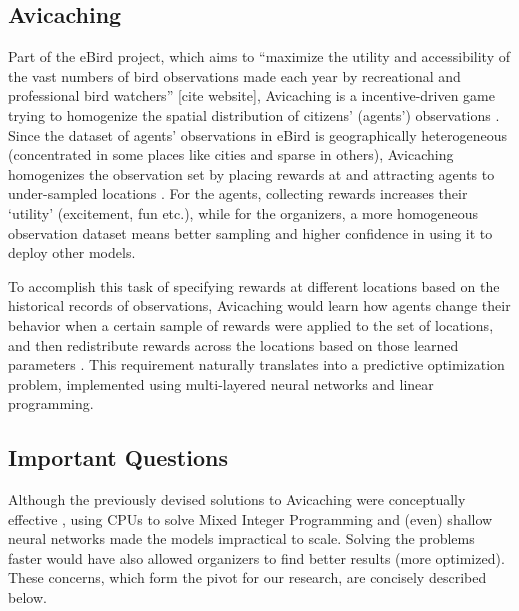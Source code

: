 \documentclass[12pt]{article}
\begin{document}
    \subsection{Avicaching}
    Part of the eBird project, which aims to ``maximize the utility and accessibility of the vast numbers of bird observations made each year by recreational and professional bird watchers'' [cite website], Avicaching is a incentive-driven game trying to homogenize the spatial distribution of citizens' (agents') observations \cite{Xue2016Avi1}. Since the dataset of agents' observations in eBird is geographically heterogeneous (concentrated in some places like cities and sparse in others), Avicaching homogenizes the observation set by placing rewards at and attracting agents to under-sampled locations \cite{Xue2016Avi1}. For the agents, collecting rewards increases their `utility' (excitement, fun etc.), while for the organizers, a more homogeneous observation dataset means better sampling and higher confidence in using it to deploy other models. 
    
    To accomplish this task of specifying rewards at different locations based on the historical records of observations, Avicaching would learn how agents change their behavior when a certain sample of rewards were applied to the set of locations, and then redistribute rewards across the locations based on those learned parameters \cite{Xue2016Avi2}. This requirement naturally translates into a predictive optimization problem, implemented using multi-layered neural networks and linear programming.
    
    \subsection{Important Questions}
    Although the previously devised solutions to Avicaching were conceptually effective \cite{Xue2016Avi1, Xue2016Avi2}, using CPUs to solve Mixed Integer Programming and (even) shallow neural networks made the models impractical to scale. Solving the problems faster would have also allowed organizers to find better results (more optimized). These concerns, which form the pivot for our research, are concisely described below.
    
\end{document}
